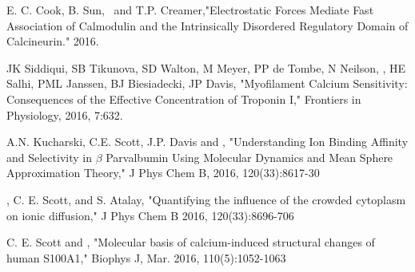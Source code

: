 \begin{resume}
\begin{etaremune}
\item E. C. Cook, B. Sun, \pmkh\ and T.P. Creamer,"Electrostatic Forces Mediate Fast Association of Calmodulin and the Intrinsically Disordered Regulatory Domain of Calcineurin." 2016. 
\item JK Siddiqui, SB Tikunova, SD Walton, M Meyer, PP de Tombe, N Neilson, \pmkh, HE Salhi, PML Janssen, BJ Biesiadecki, JP Davis, "Myofilament Calcium Sensitivity:  Consequences of the Effective Concentration of Troponin I," Frontiers in Physiology, 2016, 7:632. 
\item A.N. Kucharski, C.E. Scott, J.P. Davis and \pmkh, "Understanding Ion Binding Affinity and Selectivity in $\beta$ Parvalbumin Using Molecular Dynamics and Mean Sphere Approximation Theory," J Phys Chem B, 2016, 120(33):8617-30 
\item \pmkh, C. E. Scott, and S. Atalay, "Quantifying the influence of the crowded cytoplasm on ionic diffusion," J Phys Chem B 2016, 120(33):8696-706 
\item C. E. Scott and \pmkh, "Molecular basis of calcium-induced structural changes of human S100A1," Biophys J, Mar. 2016, 110(5):1052-1063 

\end{etaremune}

\begin{comment}
\section{\centerline{Other Significant Products}}
Five other significant publications (Total of 30)


\end{comment}
\end{resume}
